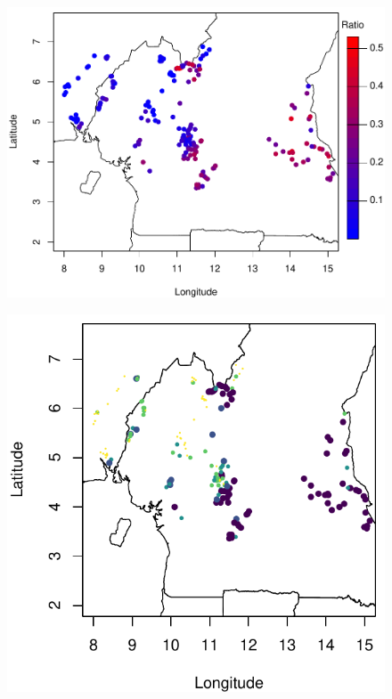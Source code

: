 \documentclass[9pt,compress,xcolor=x11names,UTF8]{beamer}
\begin{document}
\begin{frame}
\begin{figure}
\centering
\includegraphics[width=.8\textwidth]{loaloa_ratio}  
\end{figure}
\end{frame}

\begin{frame}
\begin{figure}
\centering
\includegraphics[width=.6\textwidth]{demo02} %
\end{figure}
\end{frame}
\end{document}
